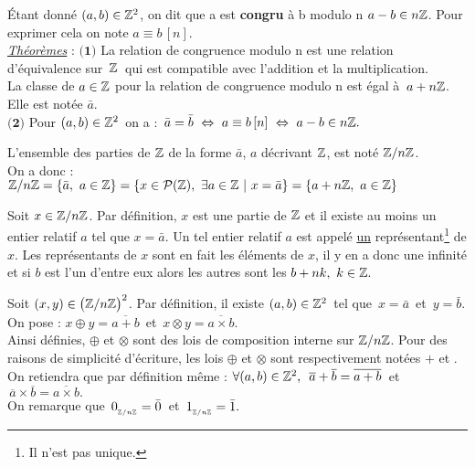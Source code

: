 \vspace{1cm}

Étant donné \((a,b)\in \mathbb{Z}^2\), on dit que a est \textbf{congru} à b modulo n \ssi \(a-b\in n\mathbb{Z}\). Pour exprimer cela on note \(a\equiv b\, [n]\).\vspace{0.5cm}\\
\underline{\emph{Théorèmes}} : \(\bigl(\mathbf{1}\bigr)\) La relation de congruence modulo n est une relation d'équivalence sur $\,\mathbb{Z}\,$ qui est compatible avec l'addition et la multiplication.\\
La classe de \(a\in \mathbb{Z}\) pour la relation de congruence modulo n est égal à \(\, a+n\mathbb{Z}\). Elle est notée \(\bar{a}\).\vspace{0.1cm}\vspace{0.3cm}\\
\(\bigl(\mathbf{2}\bigr)\) Pour \((a,b)\in \mathbb{Z}^2\, \) on a : \(\, \bar{a}=\Bar{b}\ \Leftrightarrow \ a\equiv b\, [n]\ \Leftrightarrow \ a-b\in n\mathbb{Z}. \)

\newpage

L'ensemble des parties de \(\mathbb{Z}\) de la forme \(\bar{a}\), \(a\) décrivant \(\mathbb{Z}\), est noté \(\mathbb{Z}/n\mathbb{Z}\).\vspace{0.1cm}\\
On a donc : \(\ZZ/n\ZZ=\{\bar{a},\ a\in \ZZ\}=\{x\in \mathcal{P}(\ZZ),\ \exists a\in \ZZ \ \rvert \ x=\bar{a}\}=\{a+n\ZZ,\ a\in \ZZ\}\)

\vspace{1cm}

\begin{small}
    Soit \(x\in \mathbb{Z}/n\mathbb{Z}\). Par définition, \(x\) est une partie de \(\mathbb{Z}\) et il existe au moins un entier relatif $a$ tel que \(x=\bar{a}\). Un tel entier relatif $a$ est appelé \underline{un} représentant\footnote{Il n'est pas unique.} de \(x\). Les représentants de \(x\) sont en fait les éléments de \(x\), il y en a donc une infinité et si $b$ est l'un d'entre eux alors les autres sont les \(b+nk,\ k\in\mathbb{Z}.\)
\end{small}

\vspace{1.3cm}

Soit \((x,y)\in \bigl(\mathbb{Z}/n\mathbb{Z}\bigr)^2\). Par définition, il existe \((a,b)\in \mathbb{Z}^2\, \) tel que \(\,x=\bar{a}\, \) et \(\, y=\bar{b}\).\vspace{0.2cm}\\
On pose : \(x\oplus y=\overline{a+b}\,\) et \(\,x\otimes y=\overline{a\times b}\). 
\vspace*{0.1cm}\\
Ainsi définies, \(\oplus\) et \(\otimes\) sont des lois de composition interne sur \(\mathbb{Z}/n\mathbb{Z}\). Pour des raisons de simplicité d'écriture, les lois \(\oplus\) et \(\otimes\) sont respectivement notées $+$ et \x.\vspace{0.2cm}\\
On retiendra que par définition même : \(\forall (a,b)\in \mathbb{Z}^2,\ \, \overline{a}+\overline{b}=\overline{a+b}\,\) et \(\,\overline{a}\times \overline{b}=\overline{a\times b}.\)\vspace{0.2cm}\\
On remarque que \(\, 0_{_{\mathbb{Z}/n\mathbb{Z}}}=\bar{0}\,\) et \(\, 1_{_{\mathbb{Z}/n\mathbb{Z}}}=\bar{1}.\)

\vspace{2cm}